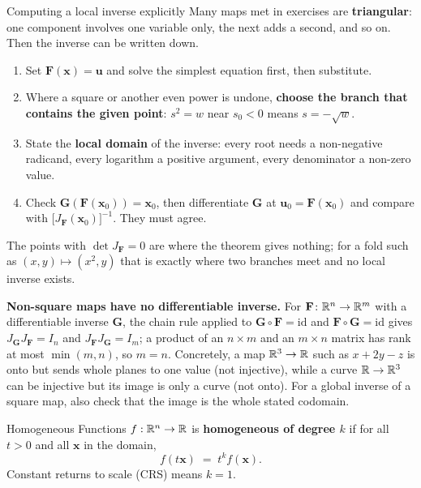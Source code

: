 \begin{rulebox}{Computing a local inverse explicitly}
Many maps met in exercises are \textbf{triangular}: one component involves
one variable only, the next adds a second, and so on. Then the inverse can
be written down.
\begin{enumerate}[leftmargin=1.6em,itemsep=0.3ex]
  \item Set $\mathbf{F}(\mathbf{x})=\mathbf{u}$ and solve the simplest
        equation first, then substitute.
  \item Where a square or another even power is undone, \textbf{choose the
        branch that contains the given point}: $s^{2}=w$ near $s_{0}<0$
        means $s=-\sqrt{w}$.
  \item State the \textbf{local domain} of the inverse: every root needs a
        non-negative radicand, every logarithm a positive argument, every
        denominator a non-zero value.
  \item Check $\mathbf{G}(\mathbf{F}(\mathbf{x}_{0}))=\mathbf{x}_{0}$, then
        differentiate $\mathbf{G}$ at $\mathbf{u}_{0}=\mathbf{F}(\mathbf{x}_{0})$
        and compare with $\bigl[J_{\mathbf{F}}(\mathbf{x}_{0})\bigr]^{-1}$.
        They must agree.
\end{enumerate}
The points with $\det J_{\mathbf{F}}=0$ are where the theorem gives
nothing; for a fold such as $(x,y)\mapsto(x^{2},y)$ that is exactly where
two branches meet and no local inverse exists.

\textbf{Non-square maps have no differentiable inverse.} For
$\mathbf{F}\colon\mathbb{R}^{n}\to\mathbb{R}^{m}$ with a differentiable inverse
$\mathbf{G}$, the chain rule applied to $\mathbf{G}\circ\mathbf{F}=\mathrm{id}$
and $\mathbf{F}\circ\mathbf{G}=\mathrm{id}$ gives $J_{\mathbf{G}}J_{\mathbf{F}}
=I_{n}$ and $J_{\mathbf{F}}J_{\mathbf{G}}=I_{m}$; a product of an $n\times m$
and an $m\times n$ matrix has rank at most $\min(m,n)$, so $m=n$. Concretely,
a map $\mathbb{R}^{3}\to\mathbb{R}$ such as
$x+2y-z$ is onto but sends whole planes to one value (not injective), while
a curve $\mathbb{R}\to\mathbb{R}^{3}$ can be injective but its image is only a curve (not
onto). For a global inverse of a square map, also check that the image is
the whole stated codomain.
\end{rulebox}

\begin{rulebox}{Homogeneous Functions}
$f:\mathbb{R}^{n}\to\mathbb{R}$ is \textbf{homogeneous of degree $k$} if for all $t>0$ and
all $\mathbf{x}$ in the domain,
\[
  f(t\mathbf{x}) \;=\; t^{k}f(\mathbf{x}) .
\]
Constant returns to scale (CRS) means $k=1$.
\end{rulebox}


